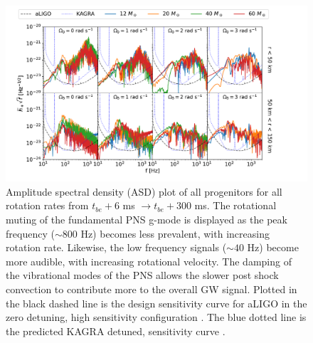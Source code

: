 \documentclass[twocolumn,times]{aastex62}  %
\begin{document}
\begin{figure}[t!]
  \centering     %
  \includegraphics[width=\textwidth]{figures/tbe6tbe300_combined_M1_long.pdf}
  \caption{Amplitude spectral density (ASD) plot of all progenitors for all rotation rates from $t_{be}+6$ ms $\rightarrow t_{be}+300$ ms.  The rotational muting of the fundamental PNS g-mode is displayed as the peak frequency ($\sim 800$ Hz) becomes less prevalent, with increasing rotation rate.  Likewise, the low frequency signals ($\sim40$ Hz) become more audible, with increasing rotational velocity.  The damping of the vibrational modes of the PNS allows the slower post shock convection to contribute more to the overall GW signal.  Plotted in the black dashed line is the design sensitivity curve for aLIGO in the zero detuning, high sensitivity configuration \citep{barsotti:2018}.  The blue dotted line is the predicted KAGRA detuned, sensitivity curve \citep{komari:2017}.}
  \label{fig:spetra_long}
\end{figure}
\end{document}
